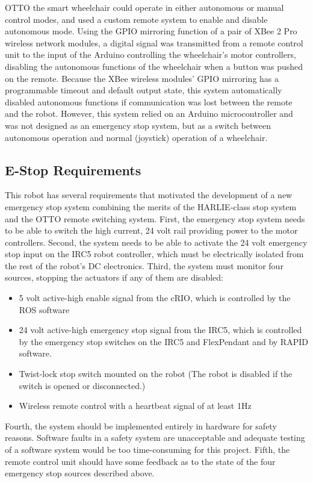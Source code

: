 \documentclass[]{cwru} %
\begin{document}
OTTO the smart wheelchair could operate in either autonomous or manual
control modes, and used a custom remote system to enable and disable
autonomous mode. Using the GPIO mirroring function of a pair of XBee 2
Pro wireless network modules, a digital signal was transmitted from a
remote control unit to the input of the Arduino controlling the
wheelchair's motor controllers, disabling the autonomous functions of
the wheelchair when a button was pushed on the remote. Because the XBee
wireless modules' GPIO mirroring has a programmable timeout and default
output state, this system automatically disabled autonomous functions if
communication was lost between the remote and the robot. However, this
system relied on an Arduino microcontroller and was not designed as an
emergency stop system, but as a switch between autonomous operation and
normal (joystick) operation of a wheelchair.

\subsection{E-Stop Requirements}


This robot has several requirements that motivated the development of a
new emergency stop system combining the merits of the HARLIE-class stop
system and the OTTO remote switching system. First, the emergency stop
system needs to be able to switch the high current, 24 volt rail
providing power to the motor controllers. Second, the system needs to be
able to activate the 24 volt emergency stop input on the IRC5 robot
controller, which must be electrically isolated from the rest of the
robot's DC electronics. Third, the system must monitor four sources,
stopping the actuators if any of them are disabled:

\begin{itemize}
\item
  5 volt active-high enable signal from the cRIO, which is controlled by
  the ROS software
\item
  24 volt active-high emergency stop signal from the IRC5, which is
  controlled by the emergency stop switches on the IRC5 and FlexPendant
  and by RAPID software.
\item
  Twist-lock stop switch mounted on the robot (The robot is disabled if
  the switch is opened or disconnected.)
\item
  Wireless remote control with a heartbeat signal of at least 1Hz
\end{itemize}

Fourth, the system should be implemented entirely in hardware for safety
reasons. Software faults in a safety system are unacceptable and
adequate testing of a software system would be too time-consuming for
this project. Fifth, the remote control unit should have some feedback
as to the state of the four emergency stop sources described above.
\end{document}
